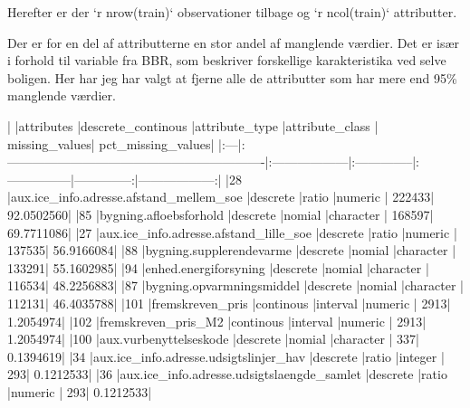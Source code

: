 \documentclass{report}
\begin{document}
Herefter er der `r nrow(train)` observationer tilbage og `r ncol(train)` attributter.

Der er for en del af attributterne en stor andel af manglende værdier. Det er især i forhold til variable fra BBR, som beskriver forskellige karakteristika ved selve boligen. Her har jeg har valgt at fjerne alle de attributter som har mere end 95\% manglende værdier.

\begin{Schunk}
\begin{Soutput}
|    |attributes                                                    |descrete_continous |attribute_type |attribute_class | missing_values| pct_missing_values|
|:---|:-------------------------------------------------------------|:------------------|:--------------|:---------------|--------------:|------------------:|
|28  |aux.ice_info.adresse.afstand_mellem_soe                       |descrete           |ratio          |numeric         |         222433|         92.0502560|
|85  |bygning.afloebsforhold                                        |descrete           |nomial         |character       |         168597|         69.7711086|
|27  |aux.ice_info.adresse.afstand_lille_soe                        |descrete           |ratio          |numeric         |         137535|         56.9166084|
|88  |bygning.supplerendevarme                                      |descrete           |nomial         |character       |         133291|         55.1602985|
|94  |enhed.energiforsyning                                         |descrete           |nomial         |character       |         116534|         48.2256883|
|87  |bygning.opvarmningsmiddel                                     |descrete           |nomial         |character       |         112131|         46.4035788|
|101 |fremskreven_pris                                              |continous          |interval       |numeric         |           2913|          1.2054974|
|102 |fremskreven_pris_M2                                           |continous          |interval       |numeric         |           2913|          1.2054974|
|100 |aux.vurbenyttelseskode                                        |descrete           |nomial         |character       |            337|          0.1394619|
|34  |aux.ice_info.adresse.udsigtslinjer_hav                        |descrete           |ratio          |integer         |            293|          0.1212533|
|36  |aux.ice_info.adresse.udsigtslaengde_samlet                    |descrete           |ratio          |numeric         |            293|          0.1212533|

\end{Soutput}
\end{Schunk}
\end{document}
